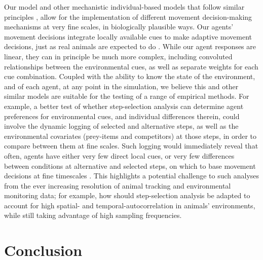 Our model and other mechanistic individual-based models that follow similar principles \citep{getz2015,getz2016,netz2021}, allow for the implementation of different movement decision-making mechanisms at very fine scales, in biologically plausible ways.
Our agents' movement decisions integrate locally available cues to make adaptive movement decisions, just as real animals are expected to do \citep{nathan2008a}.
While our agent responses are linear, they can in principle be much more complex, including convoluted relationships between the environmental cues, as well as separate weights for each cue combination.
Coupled with the ability to know the state of the environment, and of each agent, at any point in the simulation, we believe this and other similar models are suitable for the testing of a range of empirical methods.
For example, a better test of whether step-selection analysis can determine agent preferences for environmental cues, and individual differences therein, could involve the dynamic logging of selected and alternative steps, as well as the environmental covariates (prey-items and competitors) at those steps, in order to compare between them at fine scales.
Such logging would immediately reveal that often, agents have either very few direct local cues, or very few differences between conditions at alternative and selected steps, on which to base movement decisions at fine timescales \cite[relatively clueless regions, per][]{perkins1992}.
This highlights a potential challenge to such analyses from the ever increasing resolution of animal tracking and environmental monitoring data; for example, how should step-selection analysis be adapted to account for high spatial- and temporal-autocorrelation in animals' environments, while still taking advantage of high sampling frequencies.

\section*{Conclusion}

